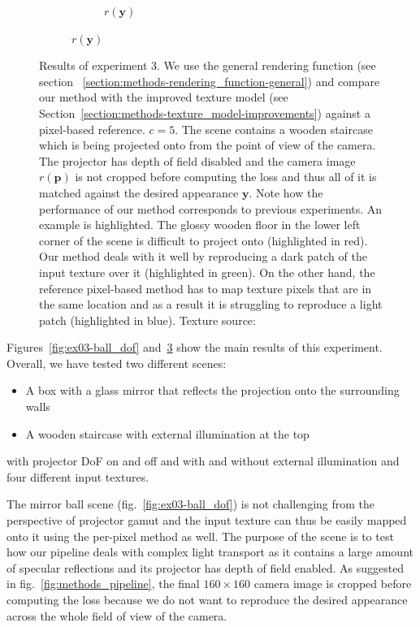 \begin{figure}[]
\begin{subfigure}{\textwidth}
\begin{subfigure}{0.19\textwidth}
            \caption{\(r(\bm{y})\)}
            \label{fig:ex03-staircase_illum-beams-pixel_proj}
        \end{subfigure}
    \end{subfigure}
    \caption{Results of experiment 3. We use the general rendering function (see section ~\ref{section:methods-rendering_function-general}) and compare our method with the improved texture model (see Section~\ref{section:methods-texture_model-improvements}) against a pixel-based reference. \(c = 5\). The scene contains a wooden staircase which is being projected onto from the point of view of the camera. The projector has depth of field disabled and the camera image \(r(\bm{p})\) is not cropped before computing the loss and thus all of it is matched against the desired appearance \(\bm{y}\). Note how the performance of our method corresponds to previous experiments. An example is highlighted. The glossy wooden floor in the lower left corner of the scene is difficult to project onto (highlighted in red). Our method deals with it well by reproducing a dark patch of the input texture over it (highlighted in green). On the other hand, the reference pixel-based method has to map texture pixels that are in the same location and as a result it is struggling to reproduce a light patch (highlighted in blue). Texture source: \citet{Pixar128}}
    \label{fig:ex03-staircase_illum}
\end{figure}

Figures~\ref{fig:ex03-ball_dof} and~\ref{fig:ex03-staircase_illum} show the main results of this experiment. Overall, we have tested two different scenes:

\begin{itemize}
    \item A box with a glass mirror that reflects the projection onto the surrounding walls
    \item A wooden staircase with external illumination at the top
\end{itemize}

with projector DoF on and off and with and without external illumination and four different input textures.

The mirror ball scene (fig.~\ref{fig:ex03-ball_dof}) is not challenging from the perspective of projector gamut and the input texture can thus be easily mapped onto it using the per-pixel method as well. The purpose of the scene is to test how our pipeline deals with complex light transport as it contains a large amount of specular reflections and its projector has depth of field enabled. As suggested in fig.~\ref{fig:methods_pipeline}, the final \(160 \times 160\) camera image is cropped before computing the loss because we do not want to reproduce the desired appearance across the whole field of view of the camera.

